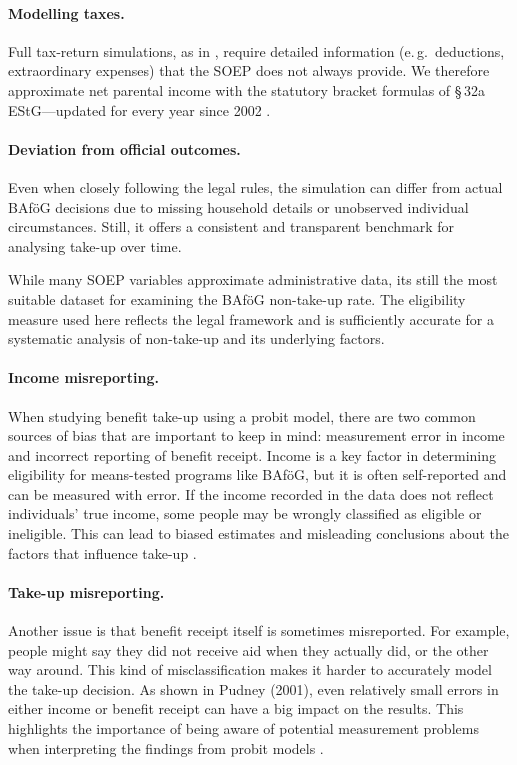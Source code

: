 \paragraph{Modelling taxes.}
Full tax‑return simulations, as in \cite{herber_non-take-up_2019}, require detailed information (e.\,g.\ deductions, extraordinary expenses) that the SOEP does not always provide.  
We therefore approximate net parental income with the statutory bracket formulas of §\,32a EStG—updated for every year since 2002 \citep{estg_law,estg_2025,estg_2024,estg_2023,estg_2022,estg_2021,estg_2020,estg_2019,estg_2018,estg_2017,estg_2016,estg_2015,estg_2014,estg_2013,estg_2012,estg_2007,estg_2006,estg_lohninfo_2012}.  
\paragraph{Deviation from official outcomes.}
Even when closely following the legal rules, the simulation can differ from actual BAföG decisions due to missing household details or unobserved individual circumstances. 
Still, it offers a consistent and transparent benchmark for analysing take-up over time.

While many SOEP variables approximate administrative data, its still the most suitable dataset for examining the BAföG non-take-up rate. 
The eligibility measure used here reflects the legal framework and is sufficiently accurate for a systematic analysis of non-take-up and its underlying factors.


\paragraph{Income misreporting.}
When studying benefit take-up using a probit model, there are two common sources of bias that are important to keep in mind: measurement error in income and incorrect reporting of benefit receipt. Income is a key factor in determining eligibility for means-tested programs like BAföG, but it is often self-reported and can be measured with error. If the income recorded in the data does not reflect individuals' true income, some people may be wrongly classified as eligible or ineligible. This can lead to biased estimates and misleading conclusions about the factors that influence take-up \cite{pudney_impact_2001}.

\paragraph{Take-up misreporting.} Another issue is that benefit receipt itself is sometimes misreported. For example, people might say they did not receive aid when they actually did, or the other way around. This kind of misclassification makes it harder to accurately model the take-up decision. As shown in Pudney (2001), even relatively small errors in either income or benefit receipt can have a big impact on the results. This highlights the importance of being aware of potential measurement problems when interpreting the findings from probit models \cite{pudney_impact_2001}.


